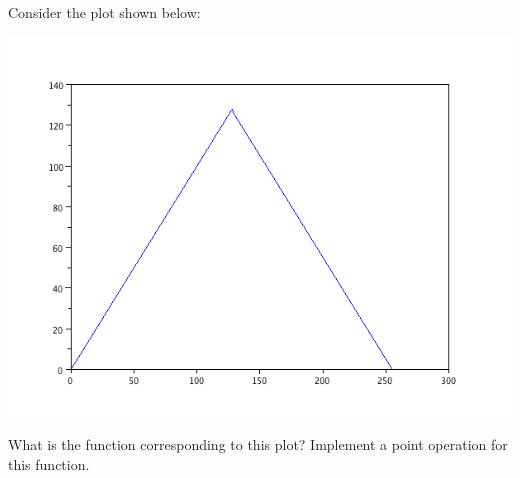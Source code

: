 \documentclass{book}
\begin{document}
\begin{exercise}
Consider the plot shown below:
\begin{center}
\includegraphics[scale=0.2]{vplot.png}
\end{center}
What is the function corresponding to this plot? Implement a point operation for this function.
\end{exercise}
\end{document}
